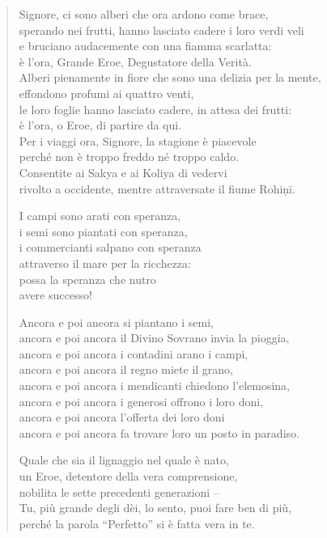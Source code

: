 \begin{quote}

  Signore, ci sono alberi che ora ardono come brace, \\
  sperando nei frutti, hanno lasciato cadere i loro verdi veli \\
  e bruciano audacemente con una fiamma scarlatta: \\
  è l’ora, Grande Eroe, Degustatore della Verità. \\
  Alberi pienamente in fiore che sono una delizia per la mente, \\
  effondono profumi ai quattro venti, \\
  le loro foglie hanno lasciato cadere, in attesa dei frutti: \\
  è l’ora, o Eroe, di partire da qui. \\
  Per i viaggi ora, Signore, la stagione è piacevole \\
  perché non è troppo freddo né troppo caldo. \\
  Consentite ai Sakya e ai Koliya di vedervi \\
  rivolto a occidente, mentre attraversate il fiume Rohiṇī.

  I campi sono arati con speranza, \\
  i semi sono piantati con speranza, \\
  i commercianti salpano con speranza \\
  attraverso il mare per la ricchezza: \\
  possa la speranza che nutro \\
  avere successo!

  Ancora e poi ancora si piantano i semi, \\
  ancora e poi ancora il Divino Sovrano invia la pioggia, \\
  ancora e poi ancora i contadini arano i campi, \\
  ancora e poi ancora il regno miete il grano, \\
  ancora e poi ancora i mendicanti chiedono l’elemosina, \\
  ancora e poi ancora i generosi offrono i loro doni, \\
  ancora e poi ancora l’offerta dei loro doni \\
  ancora e poi ancora fa trovare loro un posto in paradiso.

  Quale che sia il lignaggio nel quale è nato, \\
  un Eroe, detentore della vera comprensione, \\
  nobilita le sette precedenti generazioni – \\
  Tu, più grande degli dèi, lo sento, puoi fare ben di più, \\
  perché la parola “Perfetto” si è fatta vera in te.

\end{quote}

